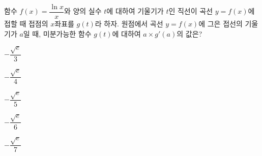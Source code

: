 함수 $f(x)=\dfrac{\ln x}{x}$와 양의 실수 $t$에 대하여 기울기가 $t$인 직선이 곡선 $y=f(x)$에 접할 때 접점의 $x$좌표를 $g(t)$라 하자. 원점에서 곡선 $y=f(x)$에 그은 접선의 기울기가 $a$일 때, 미분가능한 함수 $g(t)$에 대하여 $a\times g'(a)$의 값은?
\begin{choices32}{\rule[-3ex]{0pt}{8ex}$-\dfrac{\sqrt{e}}{3}$}{\rule[-3ex]{0pt}{8ex}$-\dfrac{\sqrt{e}}{4}$}{\rule[-3ex]{0pt}{8ex}$-\dfrac{\sqrt{e}}{5}$}{\rule[-3ex]{0pt}{8ex}$-\dfrac{\sqrt{e}}{6}$}{\rule[-3ex]{0pt}{8ex}$-\dfrac{\sqrt{e}}{7}$}\end{choices32}
